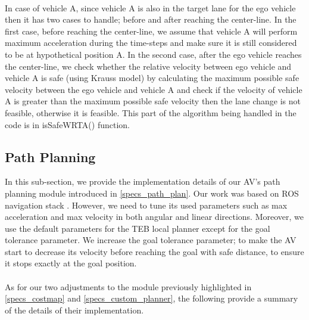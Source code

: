 \\
In case of vehicle A, since vehicle A is also in the target lane for the ego vehicle then it has two cases to handle; before and after reaching the center-line. In the first case, before reaching the center-line, we assume that vehicle A will perform maximum acceleration during the time-steps and make sure it is still considered to be at hypothetical position A. In the second case, after the ego vehicle reaches the center-line, we check whether the relative velocity between ego vehicle and vehicle A is safe (using Krauss model) by calculating the maximum possible safe velocity between the ego vehicle and vehicle A and check if the velocity of vehicle A is greater than the maximum possible safe velocity then the lane change is not feasible, otherwise it is feasible. This part of the algorithm being handled in the code is in isSafeWRTA() function. \\




\subsection{Path Planning}
\label{method_path_plan}
In this sub-section, we provide the implementation details of our AV's path planning module introduced in \ref{specs_path_plan}. Our work was based on ROS navigation stack \cite{ROS_nav_stack}. However, we need to tune its used parameters such as max acceleration and max velocity in both angular and linear directions. Moreover, we use the default parameters for the TEB local planner \cite{ROS_TEB_local_planner} except for the goal tolerance parameter. We increase the goal tolerance parameter; to make the AV start to decrease its velocity before reaching the goal with safe distance, to ensure it stops exactly at the goal position.\\ \\
As for our two adjustments to the module previously highlighted in \ref{specs_costmap} and \ref{specs_custom_planner}, the following provide a summary of the details of their implementation.


